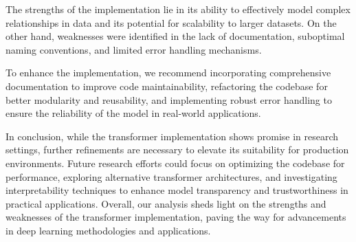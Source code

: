 \documentclass[a4paper,11pt]{article}
\begin{document}
The strengths of the implementation lie in its ability to effectively model complex relationships in data and its potential for scalability to larger datasets. On the other hand, weaknesses were identified in the lack of documentation, suboptimal naming conventions, and limited error handling mechanisms.

To enhance the implementation, we recommend incorporating comprehensive documentation to improve code maintainability, refactoring the codebase for better modularity and reusability, and implementing robust error handling to ensure the reliability of the model in real-world applications.

In conclusion, while the transformer implementation shows promise in research settings, further refinements are necessary to elevate its suitability for production environments. Future research efforts could focus on optimizing the codebase for performance, exploring alternative transformer architectures, and investigating interpretability techniques to enhance model transparency and trustworthiness in practical applications. Overall, our analysis sheds light on the strengths and weaknesses of the transformer implementation, paving the way for advancements in deep learning methodologies and applications.
\end{document}

